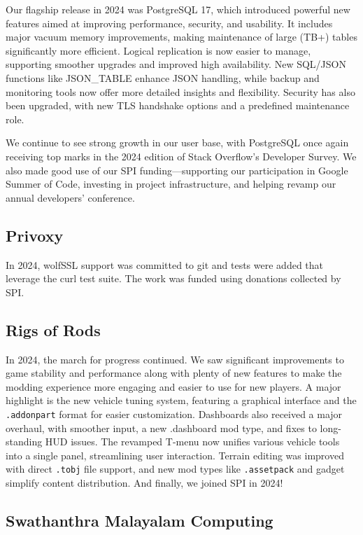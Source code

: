 \documentclass[a4paper]{report}
\begin{document}
Our flagship release in 2024 was PostgreSQL 17, which introduced powerful new features aimed at improving performance, security, and usability. It includes major vacuum memory improvements, making maintenance of large (TB+) tables significantly more efficient. Logical replication is now easier to manage, supporting smoother upgrades and improved high availability. New SQL/JSON functions like JSON\_TABLE enhance JSON handling, while backup and monitoring tools now offer more detailed insights and flexibility. Security has also been upgraded, with new TLS handshake options and a predefined maintenance role.

We continue to see strong growth in our user base, with PostgreSQL once again receiving top marks in the 2024 edition of Stack Overflow’s Developer Survey. We also made good use of our SPI funding—supporting our participation in Google Summer of Code, investing in project infrastructure, and helping revamp our annual developers’ conference.

\subsection{Privoxy}

In 2024, wolfSSL support was committed to git and tests were added that leverage the curl test suite. The work was funded using donations collected by SPI.

\subsection{Rigs of Rods}

In 2024, the march for progress continued. We saw significant improvements to game stability and performance along with plenty of new features to make the modding experience more engaging and easier to use for new players. A major highlight is the new vehicle tuning system, featuring a graphical interface and the {\tt .addonpart} format for easier customization. Dashboards also received a major overhaul, with smoother input, a new .dashboard mod type, and fixes to long-standing HUD issues. The revamped T-menu now unifies various vehicle tools into a single panel, streamlining user interaction. Terrain editing was improved with direct {\tt .tobj} file support, and new mod types like {\tt .assetpack} and gadget simplify content distribution. And finally, we joined SPI in 2024!

\subsection{Swathanthra Malayalam Computing}
\end{document}
